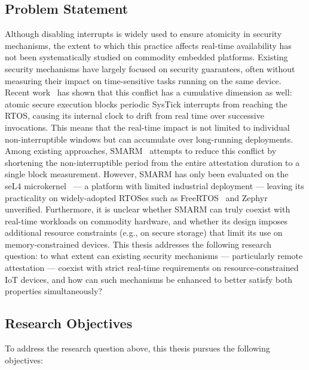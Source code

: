 \documentclass[a4paper,10pt]{article}
\begin{document}
\subsection{Problem Statement}

Although disabling interrupts is widely used to ensure atomicity in security mechanisms, the extent to which this practice affects real-time availability has not been systematically studied on commodity embedded platforms. Existing security mechanisms \cite{eldefrawy2012smart,nunes2019vrased,eldefrawy2017hydra,li2017epoxy,nunes2019aces,nunes2021pistis,wang2022mytee} have largely focused on security guarantees, often without measuring their impact on time-sensitive tasks running on the same device.
Recent work~\cite{joianeto2026iccad} has shown that this conflict has a cumulative dimension as well: atomic secure execution blocks periodic SysTick interrupts from reaching the RTOS, causing its internal clock to drift from real time over successive invocations. This means that the real-time impact is not limited to individual non-interruptible windows but can accumulate over long-running deployments.
Among existing approaches, SMARM~\cite{carpent2018smarm} attempts to reduce this conflict by shortening the non-interruptible period from the entire attestation duration to a single block measurement. However, SMARM has only been evaluated on the seL4 microkernel~\cite{klein2009sel4} — a platform with limited industrial deployment — leaving its practicality on widely-adopted RTOSes such as FreeRTOS~\cite{freertos2025} and Zephyr~\cite{zephyr2024} unverified. Furthermore, it is unclear whether SMARM can truly coexist with real-time workloads on commodity hardware, and whether its design imposes additional resource constraints (e.g., on secure storage) that limit its use on memory-constrained devices.
This thesis addresses the following research question: 
to what extent can existing security mechanisms — particularly 
remote attestation — coexist with strict real-time requirements 
on resource-constrained IoT devices, and how can such mechanisms 
be enhanced to better satisfy both properties simultaneously?

\subsection{Research Objectives}

To address the research question above, this thesis pursues the
following objectives:
\end{document}
